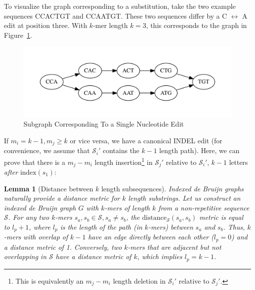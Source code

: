 \documentclass[phd]{ucbthesis}
\newtheorem{lemma}{Lemma}
\begin{document}
To visualize the graph corresponding to a substitution, take the two example sequences \textsc{CCACTGT}
and \textsc{CCAATGT}. These two sequences differ by a \textsc{C} $\leftrightarrow$ \textsc{A} edit at
position three. With $k$-mer length $k = 3$, this corresponds to the graph in Figure~\ref{fig:sne}.

\begin{figure}[h]
\begin{center}
\includegraphics[width=0.95\linewidth, clip=true, trim=0 39 0 39]{graphs/sne.pdf}
\end{center}
\caption{Subgraph Corresponding To a Single Nucleotide Edit}
\label{fig:sne}
\end{figure}

If $m_i = k - 1, m_j \ge k$ or vice versa, we have a canonical INDEL edit (for convenience, we assume
that $\mathcal{S}_i'$ contains the $k - 1$ length path). Here, we can prove that there is a $m_j - m_i$
length insertion\footnote{This is equivalently an $m_j - m_i$ length deletion in $\mathcal{S}_i'$ relative to
$\mathcal{S}_j'$.} in $\mathcal{S}_j'$ relative to $\mathcal{S}_i'$, $k - 1$ letters \emph{after}
$\text{index}(s_1)$:

\begin{lemma}[Distance between $k$ length subsequences]
\label{lem:minimum-distance}
\emph{Indexed de Bruijn} graphs naturally provide a distance metric for $k$ length substrings. Let us construct an
indexed de Bruijn graph $G$ with $k$-mers of length $k$ from a non-repetitive sequence $\mathcal{S}$.
For any two $k$-mers $s_a, s_b \in \mathcal{S}, s_a \ne s_b$, the
$\text{distance}_\mathcal{S}(s_a, s_b)$ metric is equal to $l_p + 1$, where $l_p$ is the length of the
path (in $k$-mers) between $s_a$ and $s_b$. Thus, $k$-mers with overlap of $k - 1$ have an edge
directly between each other ($l_p = 0$) and a distance metric of 1. Conversely, two $k$-mers that are
adjacent but not overlapping in $\mathcal{S}$ have a distance metric of $k$, which implies $l_p = k - 1$.
\end{lemma}
\end{document}
